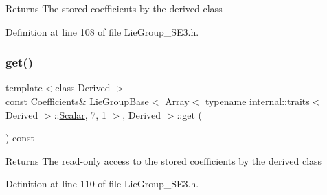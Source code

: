 \begin{DoxyReturn}{Returns}
The stored coefficients by the derived class 
\end{DoxyReturn}


Definition at line 108 of file Lie\+Group\+\_\+\+S\+E3.\+h.

\hypertarget{class_lie_group_base_3_01_array_3_01typename_01internal_1_1traits_3_01_derived_01_4_1_1_scalar_0d6d4b5459662fc32c7117aee50362fb1_a26b175476c2321427349884b00d4f5ec}{}\label{class_lie_group_base_3_01_array_3_01typename_01internal_1_1traits_3_01_derived_01_4_1_1_scalar_0d6d4b5459662fc32c7117aee50362fb1_a26b175476c2321427349884b00d4f5ec} 
\subsubsection{\texorpdfstring{get()}{get()}\hspace{0.1cm}{\footnotesize\ttfamily [2/2]}}
{\footnotesize\ttfamily template$<$class Derived $>$ \\
const \hyperlink{class_lie_group_base_3_01_array_3_01typename_01internal_1_1traits_3_01_derived_01_4_1_1_scalar_0d6d4b5459662fc32c7117aee50362fb1_a51943ca22e0a551b6d1d82e11ee073fe}{Coefficients}\& \hyperlink{class_lie_group_base}{Lie\+Group\+Base}$<$ Array$<$ typename internal\+::traits$<$ Derived $>$\+::\hyperlink{class_lie_group_base_3_01_array_3_01typename_01internal_1_1traits_3_01_derived_01_4_1_1_scalar_0d6d4b5459662fc32c7117aee50362fb1_a831695c575380c9a1df32eff9fc4a8c6}{Scalar}, 7, 1 $>$, Derived $>$\+::get (\begin{DoxyParamCaption}{ }\end{DoxyParamCaption}) const\hspace{0.3cm}{\ttfamily [inline]}}

\begin{DoxyReturn}{Returns}
The read-\/only access to the stored coefficients by the derived class 
\end{DoxyReturn}


Definition at line 110 of file Lie\+Group\+\_\+\+S\+E3.\+h.

